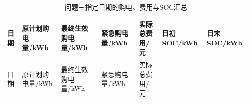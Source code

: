 \documentclass[zihao=-4,a4paper,UTF8,fontset=none]{ctexart}
\begin{document}
\begin{longtable}[]{@{}
  >{\centering\arraybackslash}p{}
  >{\centering\arraybackslash}p{}
  >{\centering\arraybackslash}p{}
  >{\centering\arraybackslash}p{}
  >{\centering\arraybackslash}p{}
  >{\centering\arraybackslash}p{}
  >{\centering\arraybackslash}p{}@{}}
\caption{问题三指定日期的购电、费用与SOC汇总}\label{tab:paper-4}\tabularnewline
\toprule\noalign{}
\begin{minipage}[b]{\linewidth}\centering
日期
\end{minipage} & \begin{minipage}[b]{\linewidth}\centering
原计划购电量/kWh
\end{minipage} & \begin{minipage}[b]{\linewidth}\centering
最终生效购电量/kWh
\end{minipage} & \begin{minipage}[b]{\linewidth}\centering
紧急购电量/kWh
\end{minipage} & \begin{minipage}[b]{\linewidth}\centering
实际总费用/元
\end{minipage} & \begin{minipage}[b]{\linewidth}\centering
日初SOC/kWh
\end{minipage} & \begin{minipage}[b]{\linewidth}\centering
日末SOC/kWh
\end{minipage} \\
\midrule\noalign{}
\endfirsthead
\toprule\noalign{}
\begin{minipage}[b]{\linewidth}\centering
日期
\end{minipage} & \begin{minipage}[b]{\linewidth}\centering
原计划购电量/kWh
\end{minipage} & \begin{minipage}[b]{\linewidth}\centering
最终生效购电量/kWh
\end{minipage} & \begin{minipage}[b]{\linewidth}\centering
紧急购电量/kWh
\end{minipage} & \begin{minipage}[b]{\linewidth}\centering
实际总费用/元
\end{minipage} & \begin{minipage}[b]{\linewidth}\centering

\end{minipage}
\end{longtable}
\end{document}
